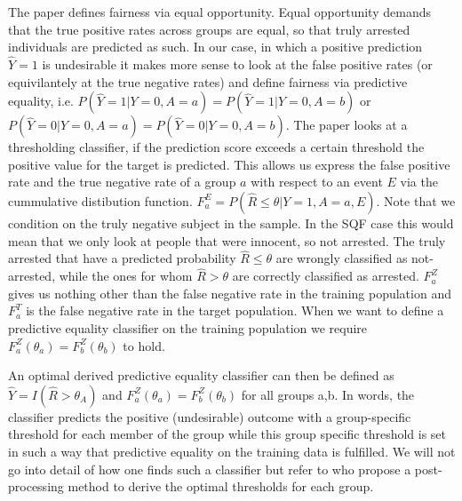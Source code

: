 The paper defines fairness via equal opportunity. Equal opportunity demands that the true positive rates across groups are equal, so that truly arrested individuals are predicted as such. In our case, in which a positive prediction $\hat{Y} = 1$ is undesirable it makes more sense to look at the false positive rates (or equivilantely at the true negative rates) and define fairness via predictive equality, i.e. $P(\hat{Y} = 1 | Y = 0, A = a) = P(\hat{Y} = 1 | Y = 0, A = b)$ or $P(\hat{Y} = 0 | Y = 0, A = a) = P(\hat{Y} = 0 | Y = 0, A = b)$.
The paper looks at a thresholding classifier, if the prediction score exceeds a certain threshold the positive value for the target is predicted.
This allows us express the false positive rate and the true negative rate of a group $a$ with respect to an event $E$ via the cummulative distibution function. $F_a^E = P(\hat{R} \leq \theta | Y = 1, A = a, E)$. Note that we condition on the truly negative subject in the sample. In the SQF case this would mean that we only look at people that were innocent, so not arrested.
The truly arrested that have a predicted probability $\hat{R} \leq \theta$ are wrongly classified as not-arrested, while the ones for whom $\hat{R} > \theta$ are correctly classified as arrested. $F_a^Z$ gives us nothing other than the false negative rate in the training population and $F_a^T$ is the false negative rate in the target population.
When we want to define a predictive equality classifier on the training population we require $F_a^Z(\theta_a) = F_b^Z(\theta_b)$ to hold. 

An optimal derived predictive equality classifier can then be defined as $\hat{Y} = I(\hat{R} > \theta_A)$ and $F_a^Z(\theta_a) = F_b^Z(\theta_b)$ for all groups a,b. In words, the classifier predicts the positive (undesirable)  outcome with a group-specific threshold for each member of the group while this group specific threshold is set in such a way that predictive equality on the training data is fulfilled. We will not go into detail of how one finds such a classifier but refer to \cite{hardt2016} who propose a post-processing method to derive the optimal thresholds for each group. 

